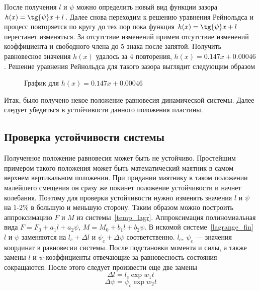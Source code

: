\documentclass[a4paper,14pt]{extarticle}
\begin{document}
После получения  $l$ и $\psi$ можно определить новый вид функции зазора $h(x) = \tg{\psi} x + l$. Далее снова переходим к решению уравнения Рейнольдса и процесс повторяется по кругу до тех пор пока функция  $h(x) = \tg{\psi} x + l$ перестанет изменяться.
За отсутствие изменений примем отсутствие изменений коэффициента и свободного члена до 5 знака после запятой. 
Получить равновесное значения $h(x)$ удалось за 4 повторения, $h(x) = 0.147 x + 0.00046$. 
Решение уравнения Рейнольдса для такого зазора выглядит следующим образом
\begin{figure}[!htbp]
	\caption{График для $h(x) = 0.147 x + 0.00046$}
	\label{part_2-zazor}
\end{figure}

\noindent Итак, было получено некое положение равновесия динамической системы. Далее следует убедиться в устойчивости данного положения пластины.


\subsection{Проверка устойчивости системы}
Полученное положение равновесия может быть не устойчиво. Простейшим примером такого положения может быть математический маятник в самом верхнем вертикальном положении. При придании маятнику в таком положении малейшего смещения он сразу же покинет положение устойчивости и начнет колебания. Поэтому для проверки устойчивости нужно изменять значения $l$ и $\psi$ на 1-2\% в большую и меньшую сторону.  Таким образом  можно построить аппроксимацию $F$ и $M$ из системы~\eqref{temp_lagr}. Аппроксимация полиномиальная вида $F = F_0 + a_1 l + a_2 \psi$, $M = M_0 + b_1 l + b_2 \psi$.
В искомой системе~\eqref{lagrange_fin} $l$ и $\psi$ заменяются на $l_c + \Delta{l}$ и $\psi_c + \Delta{\psi}$ соответственно. $l_c$, $\psi_c$ --- значения координат в равновесии системы. После подстановки момента и силы, а также замены $l$ и $\psi$ коэффициенты отвечающие за равновесность состояния сокращаются. После этого следует произвести еще две замены
\begin{equation*}
	\Delta{l} = l_c \exp{w_1 t}
\end{equation*}
\begin{equation*}
	\Delta{\psi} = \psi_c \exp{w_2 t}
\end{equation*}
\end{document}
